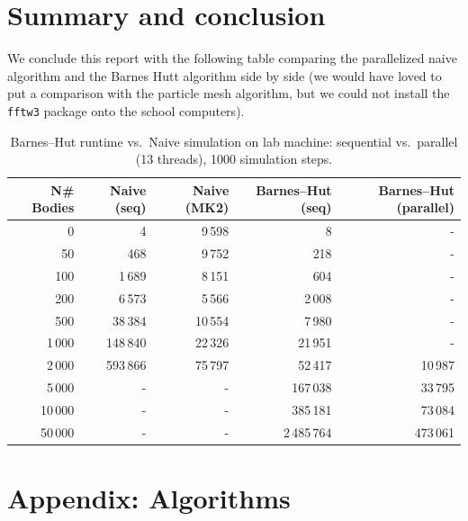 \documentclass{article}
\begin{document}
\section{Summary and conclusion}

We conclude this report with the following table comparing the parallelized naive algorithm and the Barnes Hutt algorithm side by side (we would have loved to put a comparison with the particle mesh algorithm, but we could not install the \texttt{fftw3} package onto the school computers).

\begin{table}[H]
    \centering
    \begin{tabular}{|r|r|r|r|r|}
    \hline
    \textbf{N\# Bodies} & \textbf{Naive (seq)} & \textbf{Naive (MK2)} & \textbf{Barnes–Hut (seq)} & \textbf{Barnes–Hut (parallel)} \\
    \hline
    0      & 4      & 9\,598   & 8       & -       \\ 
    50     & 468    & 9\,752   & 218     & -       \\ 
    100    & 1\,689 & 8\,151   & 604     & -       \\ 
    200    & 6\,573 & 5\,566   & 2\,008  & -       \\ 
    500    & 38\,384& 10\,554  & 7\,980  & -       \\ 
    1\,000 & 148\,840& 22\,326 & 21\,951 & -       \\ 
    2\,000 & 593\,866& 75\,797 & 52\,417 & 10\,987  \\ 
    5\,000 & -      & -        & 167\,038& 33\,795  \\ 
    10\,000& -      & -        & 385\,181& 73\,084  \\ 
    50\,000& -      & -        & 2\,485\,764 & 473\,061  \\ 
    \hline
    \end{tabular}
    \caption{Barnes–Hut runtime vs.\ Naive simulation on lab machine: sequential vs.\ parallel (13 threads), 1000 simulation steps.}
    \label{tab:bh_seq_vs_par}
\end{table}











\appendix
\newpage
\section{Appendix: Algorithms}
\end{document}
